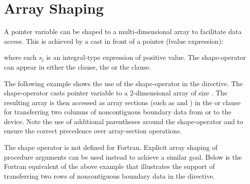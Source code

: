 \section{Array Shaping}
\label{sec:array-shaping}



\begin{ccppspecific}
A pointer variable can be shaped to a multi-dimensional array to facilitate
data access. This is achieved by a  cast in front of 
a pointer (lvalue expression):
\begin{description}
\item[]\hspace*{5mm}
\end{description}
where each $s_i$ is an integral-type expression of positive value.
The shape-operator can appear in either the  clause, the
 or the  clause.

The following example shows the use of the shape-operator in the 
 directive. The shape-operator \ucode{([nx][ny+2])}
casts pointer variable  to a 2-dimensional array of size
.  The resulting array is then accessed as
array sections (such as \ucode{[0:nx][1]} and \ucode{[0:nx][ny]}) 
in the  or  clause for transferring two columns of 
noncontiguous boundary data from or to the device.  
Note the use of additional parentheses
around the shape-operator and  to ensure the correct precedence 
over array-section operations.

\end{ccppspecific}

\begin{fortranspecific}
The shape operator is not defined for Fortran.  Explicit array shaping
of procedure arguments can be used instead to achieve a similar goal.
Below is the Fortran equivalent of the above example that illustrates
the support of transferring two rows of noncontiguous boundary
data in the  directive.
 
\pagebreak
{}
\end{fortranspecific}
